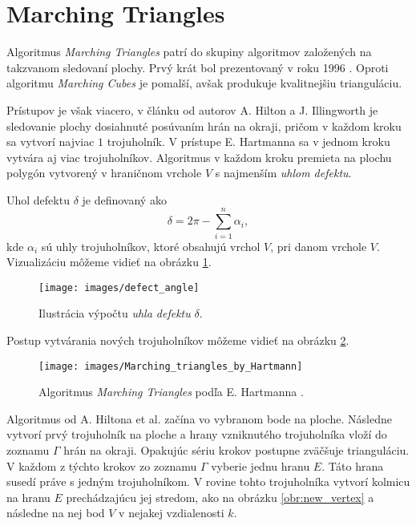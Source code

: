 \section{Marching Triangles}

\label{kap:marching_triangles}

Algoritmus \textit{Marching Triangles} patrí do skupiny algoritmov založených na takzvanom 
sledovaní plochy. Prvý krát bol prezentovaný v roku 1996 \cite{hilton1996marching}. 
Oproti algoritmu \textit{Marching Cubes} je pomalší, avšak produkuje kvalitnejšiu trianguláciu. 

Prístupov je však viacero, v článku od autorov A. Hilton a J. Illingworth \cite{hilton1996marching}
je sledovanie plochy dosiahnuté posúvaním hrán na okraji, pričom v každom kroku sa vytvorí 
najviac $1$ trojuholník. V prístupe E. Hartmanna \cite{hartmann1998marching} sa v jednom kroku 
vytvára aj viac trojuholníkov. Algoritmus v každom kroku premieta na plochu polygón vytvorený
v hraničnom vrchole $V$ s najmenším \textit{uhlom defektu}. 

\begin{definition}
    Uhol defektu $\delta$ je definovaný ako 
    $$ \delta = 2 \pi - \sum_{i=1}^{n} \alpha_i,$$
    kde $\alpha_i$ sú uhly trojuholníkov, ktoré obsahujú vrchol $V$, pri danom vrchole $V$.
    Vizualizáciu môžeme vidieť na obrázku \ref{obr:defect_angle}.
\end{definition}


\begin{figure}
    \centerline{\texttt{[image: images/defect\_angle]}}
    \caption[Uhol defektu]
    {Ilustrácia výpočtu \textit{uhla defektu} $\delta$.}
    \label{obr:defect_angle}
\end{figure}

Postup vytvárania nových trojuholníkov môžeme vidieť na obrázku \ref{obr:Marching_triangles_by_Hartmann}.

\begin{figure}
    \centerline{\texttt{[image: images/Marching\_triangles\_by\_Hartmann]}}
    \caption[Algoritmus \textit{Marching Triangles} podľa E. Hartmanna]
    {Algoritmus \textit{Marching Triangles} podľa E. Hartmanna \cite{hartmann1998marching}.}
    \label{obr:Marching_triangles_by_Hartmann}
\end{figure}

Algoritmus od A. Hiltona et al. začína vo vybranom bode na ploche. 
Následne vytvorí prvý trojuholník na ploche a hrany vzniknutého 
trojuholníka vloží do zoznamu $\Gamma$ hrán na okraji. 
Opakujúc sériu krokov postupne zväčšuje trianguláciu. V každom z týchto krokov zo zoznamu $\Gamma$
vyberie jednu hranu $E$. Táto hrana susedí práve s jedným trojuholníkom. V rovine tohto 
trojuholníka vytvorí kolmicu na hranu $E$ prechádzajúcu jej stredom, 
ako na obrázku \ref{obr:new_vertex} a následne na nej bod 
$V$ v nejakej vzdialenosti $k$. 

